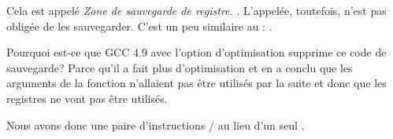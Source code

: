 Cela est appelé \emph{Zone de sauvegarde de registre.} \ARMPCS.
L'appelée, toutefois, n'est pas obligée de les sauvegarder.
C'est un peu similaire au : .

Pourquoi est-ce que GCC 4.9 avec l'option d'optimisation supprime ce code de sauvegarde?
Parce qu'il a fait plus d'optimisation et en a conclu que les arguments de la fonction
n'allaient pas être utilisés par la suite et donc que les registres 
ne vont pas être utilisés.


Nous avons donc une paire d'instructions / au lieu d'un seul .
